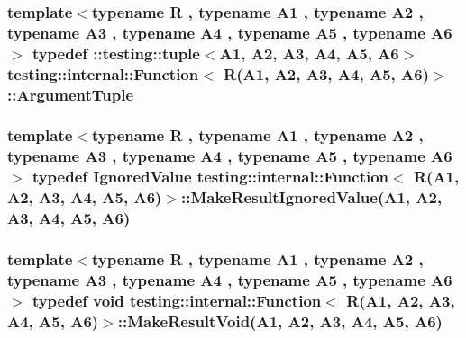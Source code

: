 \subsubsection[{\texorpdfstring{Argument\+Tuple}{ArgumentTuple}}]{\setlength{\rightskip}{0pt plus 5cm}template$<$typename R , typename A1 , typename A2 , typename A3 , typename A4 , typename A5 , typename A6 $>$ typedef \+::testing\+::tuple$<$A1, A2, A3, A4, A5, A6$>$ {\bf testing\+::internal\+::\+Function}$<$ R(A1, A2, A3, A4, A5, A6)$>$\+::{\bf Argument\+Tuple}}\hypertarget{structtesting_1_1internal_1_1_function_3_01_r_07_a1_00_01_a2_00_01_a3_00_01_a4_00_01_a5_00_01_a6_08_4_a3120b03652156e1475ce5892e1b5dd7a}{}\label{structtesting_1_1internal_1_1_function_3_01_r_07_a1_00_01_a2_00_01_a3_00_01_a4_00_01_a5_00_01_a6_08_4_a3120b03652156e1475ce5892e1b5dd7a}
\subsubsection[{\texorpdfstring{Make\+Result\+Ignored\+Value}{MakeResultIgnoredValue}}]{\setlength{\rightskip}{0pt plus 5cm}template$<$typename R , typename A1 , typename A2 , typename A3 , typename A4 , typename A5 , typename A6 $>$ typedef {\bf Ignored\+Value} {\bf testing\+::internal\+::\+Function}$<$ R(A1, A2, A3, A4, A5, A6)$>$\+::Make\+Result\+Ignored\+Value(A1, A2, A3, A4, A5, A6)}\hypertarget{structtesting_1_1internal_1_1_function_3_01_r_07_a1_00_01_a2_00_01_a3_00_01_a4_00_01_a5_00_01_a6_08_4_a20c49ac827433a288921ca0caa0d319b}{}\label{structtesting_1_1internal_1_1_function_3_01_r_07_a1_00_01_a2_00_01_a3_00_01_a4_00_01_a5_00_01_a6_08_4_a20c49ac827433a288921ca0caa0d319b}
\subsubsection[{\texorpdfstring{Make\+Result\+Void}{MakeResultVoid}}]{\setlength{\rightskip}{0pt plus 5cm}template$<$typename R , typename A1 , typename A2 , typename A3 , typename A4 , typename A5 , typename A6 $>$ typedef void {\bf testing\+::internal\+::\+Function}$<$ R(A1, A2, A3, A4, A5, A6)$>$\+::Make\+Result\+Void(A1, A2, A3, A4, A5, A6)}\hypertarget{structtesting_1_1internal_1_1_function_3_01_r_07_a1_00_01_a2_00_01_a3_00_01_a4_00_01_a5_00_01_a6_08_4_aa60c44ec945ca78297aaf7a3c785bce5}{}\label{structtesting_1_1internal_1_1_function_3_01_r_07_a1_00_01_a2_00_01_a3_00_01_a4_00_01_a5_00_01_a6_08_4_aa60c44ec945ca78297aaf7a3c785bce5}


